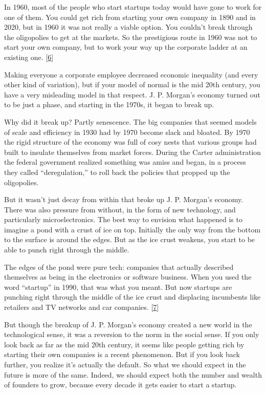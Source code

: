 In 1960, most of the people who start startups today would have gone to
work for one of them. You could get rich from starting your own company
in 1890 and in 2020, but in 1960 it was not really a viable option. You
couldn't break through the oligopolies to get at the markets. So the
prestigious route in 1960 was not to start your own company, but to work
your way up the corporate ladder at an existing one.
{[}\hyperref[f6n]{6}{]}

Making everyone a corporate employee decreased economic inequality (and
every other kind of variation), but if your model of normal is the mid
20th century, you have a very misleading model in that respect. J. P.
Morgan's economy turned out to be just a phase, and starting in the
1970s, it began to break up.

Why did it break up? Partly senescence. The big companies that seemed
models of scale and efficiency in 1930 had by 1970 become slack and
bloated. By 1970 the rigid structure of the economy was full of cosy
nests that various groups had built to insulate themselves from market
forces. During the Carter administration the federal government realized
something was amiss and began, in a process they called
``deregulation,'' to roll back the policies that propped up the
oligopolies.

But it wasn't just decay from within that broke up J. P. Morgan's
economy. There was also pressure from without, in the form of new
technology, and particularly microelectronics. The best way to envision
what happened is to imagine a pond with a crust of ice on top. Initially
the only way from the bottom to the surface is around the edges. But as
the ice crust weakens, you start to be able to punch right through the
middle.

The edges of the pond were pure tech: companies that actually described
themselves as being in the electronics or software business. When you
used the word ``startup'' in 1990, that was what you meant. But now
startups are punching right through the middle of the ice crust and
displacing incumbents like retailers and TV networks and car companies.
{[}\hyperref[f7n]{7}{]}

But though the breakup of J. P. Morgan's economy created a new world in
the technological sense, it was a reversion to the norm in the social
sense. If you only look back as far as the mid 20th century, it seems
like people getting rich by starting their own companies is a recent
phenomenon. But if you look back further, you realize it's actually the
default. So what we should expect in the future is more of the same.
Indeed, we should expect both the number and wealth of founders to grow,
because every decade it gets easier to start a startup.

